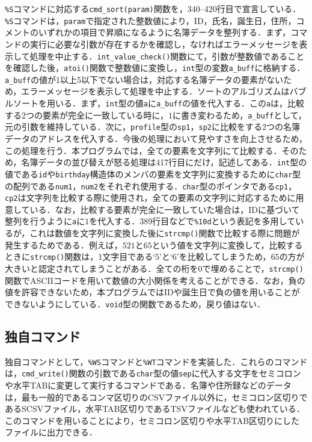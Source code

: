 \verb|%S|コマンドに対応する\verb|cmd_sort(param)|関数を，340--420行目で宣言している．\verb|%S|コマンドは，\verb|param|で指定された整数値により，ID，氏名，誕生日，住所，コメントのいずれかの項目で昇順になるように名簿データを整列する．まず，コマンドの実行に必要な引数が存在するかを確認し，なければエラーメッセージを表示して処理を中止する．\verb|int_value_check()|関数にて，引数が整数値であることを確認した後，\verb|atoi()|関数で整数値に変換し，\verb|int|型の変数\verb|a_buff|に格納する．\verb|a_buff|の値が1以上5以下でない場合は，対応する名簿データの要素がないため，エラーメッセージを表示して処理を中止する．ソートのアルゴリズムはバブルソートを用いる\cite{book:algodata}．まず，\verb|int|型の値\verb|a|に\verb|a_buff|の値を代入する．この\verb|a|は，比較する2つの要素が完全に一致している時に，$1$に書き変わるため，\verb|a_buff|として，元の引数を維持している．次に，\verb|profile|型の\verb|sp1|，\verb|sp2|に比較をする2つの名簿データのアドレスを代入する．今後の処理において見やすさを向上させるため，この処理を行う．本プログラムでは，全ての要素を文字列にて比較する．そのため，名簿データの並び替えが怒る処理は417行目にだけ，記述してある．\verb|int|型の値である\verb|id|や\verb|birthday|構造体のメンバの要素を文字列に変換するために\verb|char|型の配列である\verb|num1|，\verb|num2|をそれぞれ使用する．\verb|char|型のポインタである\verb|cp1|，\verb|cp2|は文字列を比較する際に使用され，全ての要素の文字列に対応するために用意している．なお，比較する要素が完全に一致していた場合は，IDに基づいて整列を行うように\verb|a|に$1$を代入する．389行目などで\verb|%10d|という表記を多用しているが，これは数値を文字列に変換した後に\verb|strcmp()|関数で比較する際に問題が発生するためである．例えば，$521$と$65$という値を文字列に変換して，比較するときに\verb|strcmp()|関数は，1文字目である‘$5$’と‘$6$’を比較してしまうため，$65$の方が大きいと認定されてしまうことがある．全ての桁を0で埋めることで，\verb|strcmp()|関数でASCIIコードを用いて数値の大小関係を考えることができる．なお，負の値を許容できないため，本プログラムではIDや誕生日で負の値を用いることができないようにしている．\verb|void|型の関数であるため，戻り値はない．

\subsection{独自コマンド}

独自コマンドとして，\verb|%WS|コマンドと\verb|%WT|コマンドを実装した．これらのコマンドは，\verb|cmd_write()|関数の引数である\verb|char|型の値\verb|sep|に代入する文字をセミコロンや水平TABに変更して実行するコマンドである．名簿や住所録などのデータは，最も一般的であるコンマ区切りのCSVファイル以外に，セミコロン区切りであるSCSVファイル，水平TAB区切りであるTSVファイルなども使われている．このコマンドを用いることにより，セミコロン区切りや水平TAB区切りにしたファイルに出力できる．

